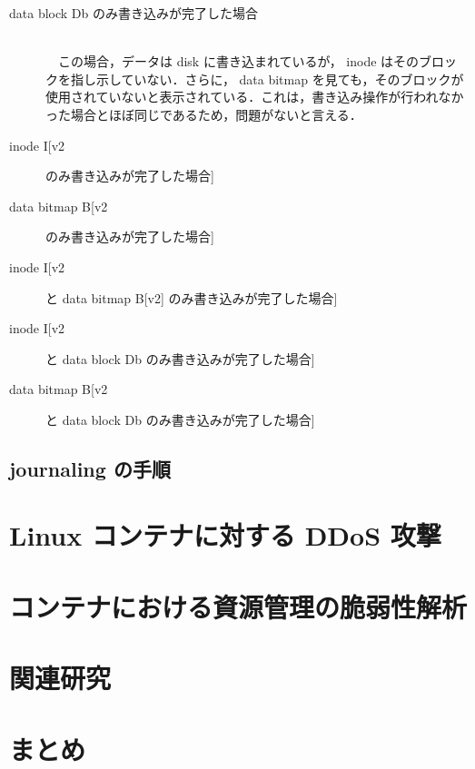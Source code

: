 \documentclass[graduation-thesis]{jsarticle}
\begin{document}
\begin{description}
	\item[data block Db のみ書き込みが完了した場合]\mbox{}\\
　この場合，データは disk に書き込まれているが， inode はそのブロックを指し示していない．さらに， data bitmap を見ても，そのブロックが使用されていないと表示されている．これは，書き込み操作が行われなかった場合とほぼ同じであるため，問題がないと言える．
	\item[inode I[v2] のみ書き込みが完了した場合]\\
	\item[data bitmap B[v2] のみ書き込みが完了した場合]\\
	\item[inode I[v2] と data bitmap B[v2] のみ書き込みが完了した場合]\\
	\item[inode I[v2] と data block Db のみ書き込みが完了した場合]\\
	\item[data bitmap B[v2] と data block Db のみ書き込みが完了した場合]\\
\end{description}
\subsection{journaling の手順}

\clearpage
\section{Linux コンテナに対する DDoS 攻撃}
\label{sec:DDoS}

\clearpage
\section{コンテナにおける資源管理の脆弱性解析}
\label{sec:analysis}

\clearpage
\section{関連研究}
\label{sec:relative}

\clearpage
\section{まとめ}
\label{sec:conclusion}
\end{document}
